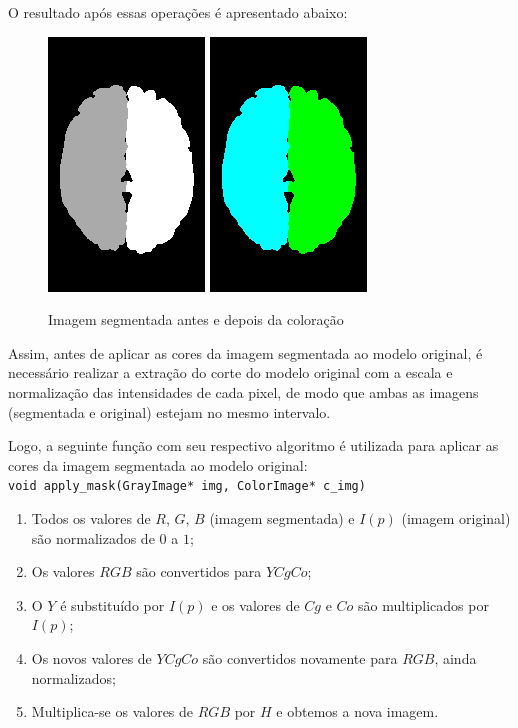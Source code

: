             O resultado após essas operações é apresentado abaixo:

            \begin{figure}[ht!]
                \centering
                \includegraphics[width=.75in]{figures/label_bw}
                \includegraphics[width=.75in]{figures/label}
                \caption{Imagem segmentada antes e depois da coloração}
            \end{figure}

            Assim, antes de aplicar as cores da imagem segmentada ao modelo original, é necessário realizar a extração do corte do modelo original com a escala e normalização das intensidades de cada pixel, de modo que ambas as imagens (segmentada e original) estejam no mesmo intervalo. 

            Logo, a seguinte função com seu respectivo algoritmo é utilizada para aplicar as cores da imagem segmentada ao modelo original: \\

            \texttt{void apply\_mask(GrayImage* img, ColorImage* c\_img)}
            \begin{enumerate}
                \item Todos os valores de $R$, $G$, $B$ (imagem segmentada) e $I(p)$ (imagem original) são normalizados de $0$ a $1$;
                \item Os valores $RGB$ são convertidos para $YCgCo$;
                \item O $Y$ é substituído por $I(p)$ e os valores de $Cg$ e $Co$ são multiplicados por $I(p)$;
                \item Os novos valores de $YCgCo$ são convertidos novamente para $RGB$, ainda normalizados;
                \item Multiplica-se os valores de $RGB$ por $H$ e obtemos a nova imagem. \\
            \end{enumerate} 

